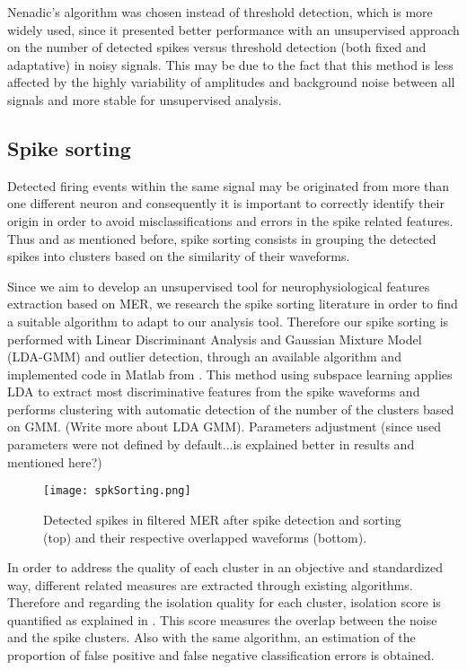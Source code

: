  Nenadic's algorithm was chosen instead of threshold detection, which is more widely used, since it presented better performance with an unsupervised approach on the number of detected spikes versus threshold detection (both fixed and adaptative) in noisy signals. This may be due to the fact that this method is less affected by the highly variability of amplitudes and background noise between all signals and more stable for unsupervised analysis. 
 
  \subsection{Spike sorting}
 \label{sec:spkSorting}
 Detected firing events within the same signal may be originated from more than one different neuron and consequently it is important to correctly identify their origin in order to avoid misclassifications and errors in the spike related features. Thus and as mentioned before, spike sorting consists in grouping the detected spikes into clusters based on the similarity of their waveforms.

Since we aim to develop an unsupervised tool for neurophysiological features extraction based on MER, we research the spike sorting literature in order to find a suitable algorithm to adapt to our analysis tool. Therefore our spike sorting is performed with Linear Discriminant Analysis and Gaussian Mixture Model (LDA-GMM) and outlier detection, through an available algorithm and implemented code in Matlab from . 
This method using subspace learning applies LDA to extract most discriminative features from the spike waveforms and performs clustering with automatic detection of the number of the clusters based on GMM.
(Write more about LDA GMM).
Parameters adjustment (since used parameters were not defined by default...is explained better in results and mentioned here?)

\begin{figure}[!htb]
     \centering   
      \texttt{[image: spkSorting.png]} 
       \caption{Detected spikes in filtered MER after spike detection and sorting (top) and their respective overlapped waveforms (bottom).}
     \label{fig:spkSorting}
\end{figure}  

In order to address the quality of each cluster in an objective and standardized way, different related measures are extracted through existing algorithms. Therefore and regarding the isolation quality for each cluster, isolation score is quantified as explained in \cite{Joshua2007}. This score measures the overlap between the noise and the spike clusters. Also with the same algorithm, an estimation of the proportion of false positive and false negative classification errors is obtained.

